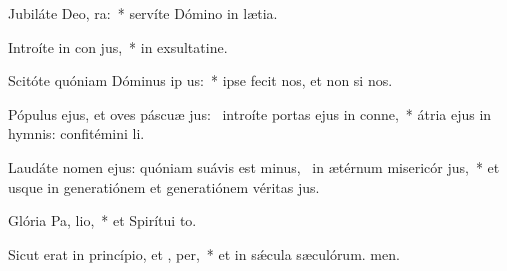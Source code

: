 \item Jubiláte Deo,  ra:~* servíte Dómino in lætia.
\item Introíte in con jus,~* in exsultatine.
\item Scitóte quóniam Dóminus ip  us:~* ipse fecit nos, et non si nos.
\item Pópulus ejus, et oves páscuæ jus:~\pscross{} introíte portas ejus in conne,~* átria ejus in hymnis: confitémini li.
\item Laudáte nomen ejus: quóniam suávis est minus,~\pscross{} in ætérnum misericór jus,~* et usque in generatiónem et generatiónem véritas jus.
\item Glória Pa,  lio,~* et Spirítui to.
\item Sicut erat in princípio, et ,  per,~* et in sǽcula sæculórum. men.
